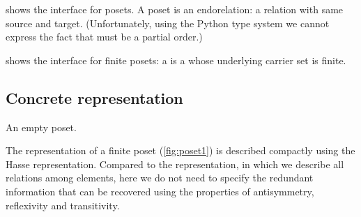 

 shows the interface for posets.
A poset is an endorelation: a relation with same source and target.
(Unfortunately, using the Python type system we cannot express the fact that  must be a partial order.)

 shows the interface for finite posets: a  is a  whose underlying carrier set is finite.




\begin{figure}[h!]
    \caption{}
    \label{fig:poset-finiteposet}
\end{figure}

\subsection{Concrete representation}
\begin{marginfigure}
    \caption{}
    \label{fig:poset1}
\end{marginfigure}
\begin{marginfigure}
    \caption{An empty poset.}
    \label{fig:poset_empty}
\end{marginfigure}

The representation of a finite poset (\cref{fig:poset1}) is described compactly using the Hasse representation.
Compared to the  representation, in which we describe all relations among elements, here we do not need to specify the redundant information that can be recovered using the properties of antisymmetry, reflexivity and transitivity.


